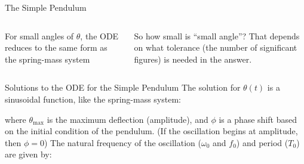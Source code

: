 \documentclass[12pt,compress,aspectratio=169]{beamer}
\begin{document}
\begin{frame}{The Simple Pendulum}
  \begin{columns}
    For small angles of $\theta$, the ODE reduces to the same form as the
    spring-mass system


    So how small is ``small angle''? That depends on what tolerance (the
    number of significant figures) is needed in the answer.
    
  \end{columns}
\end{frame}



\begin{frame}{Solutions to the ODE for the Simple Pendulum}
  The solution for $\theta(t)$ is a sinusoidal function, like the spring-mass
  system:


  where $\theta_\text{max}$ is the maximum deflection (amplitude), and $\phi$
  is a phase shift based on the initial condition of the pendulum. (If the
  oscillation begins at amplitude, then $\phi=0$) The natural frequency of
  the oscillation ($\omega_0$ and $f_0$) and period ($T_0$) are given by:
    
\end{frame}
\end{document}
